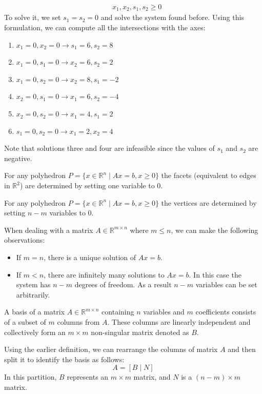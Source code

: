 \begin{example}
\begin{align*}
                                    &\: x_1,x_2,s_1,s_2 \geq 0
    \end{align*}
    To solve it, we set $s_1=s_2=0$ and solve the system found before.
    Using this formulation, we can compute all the intersections with the axes:
    \begin{enumerate}
        \item $x_1=0,x_2=0 \rightarrow s_1=6,s_2=8$
        \item $x_1=0,s_1=0 \rightarrow x_2=6,s_2=2$
        \item $x_1=0,s_2=0 \rightarrow x_2=8,s_1=-2$
        \item $x_2=0,s_1=0 \rightarrow x_1=6,s_2=-4$
        \item $x_2=0,s_2=0 \rightarrow x_1=4,s_1=2$
        \item $s_1=0,s_2=0 \rightarrow x_1=2,x_2=4$
    \end{enumerate}
    Note that solutions three and four are infeasible since the values of $s_1$ and $s_2$ are negative. 
\end{example}
\begin{property}
    For any polyhedron $P = \{x \in \mathbb{R}^n\mid Ax = b,x \geq 0\}$ the facets (equivalent to edges in $\mathbb{R}^2$) are determined by setting one variable to 0. 
\end{property}
\begin{property}   
    For any polyhedron $P = \{x \in \mathbb{R}^n\mid Ax = b,x \geq 0\}$ the vertices are determined by setting $n-m$ variables to 0. 
\end{property}

When dealing with a matrix  $A \in \mathbb{R}^{m \times n}$ where $m \leq n$, we can make the following observations:
\begin{itemize}
    \item If $m=n$, there is a unique solution of $Ax = b$.
    \item If $m<n$, there are infinitely many solutions to $Ax = b$. 
        In this case the system has $n-m$ degrees of freedom. 
        As a result $n-m$ variables can be set arbitrarily. 
\end{itemize}
\begin{definition}
    A basis of a matrix $A \in \mathbb{R}^{m \times n}$ containing $n$ variables and $m$ coefficients consists of a subset of $m$ columns from $A$. 
    These columns are linearly independent and collectively form an $m \times m$ non-singular matrix denoted as $B$. 
\end{definition}
Using the earlier definition, we can rearrange the columns of matrix $A$ and then split it to identify the basis as follows:
\[A=\left[ B\mid N \right]\]
In this partition, $B$ represents an $m \times m$ matrix, and $N$ is a $(n-m) \times m$ matrix.

